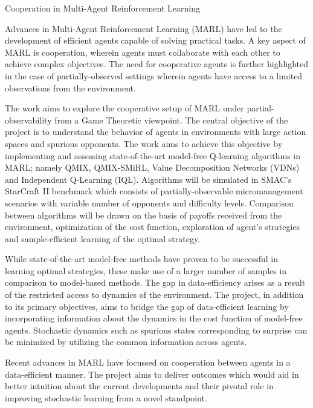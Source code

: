 \documentclass[10pt,letterpaper]{article}
\begin{document}
\begin{center}
  \large{Cooperation in Multi-Agent Reinforcement Learning}
\end{center}

Advances in Multi-Agent Reinforcement Learning (MARL) have led to the development of efficient agents capable of solving practical tasks. A key aspect of MARL is cooperation, wherein agents must collaborate with each other to achieve complex objectives. The need for cooperative agents is further highlighted in the case of partially-observed settings wherein agents have access to a limited observations from the environment.

The work aims to explore the cooperative setup of MARL under partial-observability from a Game Theoretic viewpoint. The central objective of the project is to understand the behavior of agents in environments with large action spaces and spurious opponents. The work aims to achieve this objective by implementing and assessing state-of-the-art model-free Q-learning algorithms in MARL; namely QMIX, QMIX-SMiRL, Value Decomposition Networks (VDNs) and Independent Q-Learning (IQL). Algorithms will be simulated in SMAC's StarCraft II benchmark which consists of partially-observable micromanagement scenarios with variable number of opponents and difficulty levels. Comparison between algorithms will be drawn on the basis of payoffs received from the environment, optimization of the cost function, exploration of agent's strategies and sample-efficient learning of the optimal strategy.

While state-of-the-art model-free methods have proven to be successful in learning optimal strategies, these make use of a larger number of samples in comparison to model-based methods. The gap in data-efficiency arises as a result of the restricted access to dynamics of the environment. The project, in addition to its primary objectives, aims to bridge the gap of data-efficient learning by incorporating information about the dynamics in the cost function of model-free agents. Stochastic dynamics such as spurious states corresponding to surprise can be minimized by utilizing the common information across agents. 

Recent advances in MARL have focussed on cooperation between agents in a  data-efficient manner. The project aims to deliver outcomes which would aid in better intuition about the current developments and their pivotal role in improving stochastic learning from a novel standpoint. 


\small{}
\end{document}
